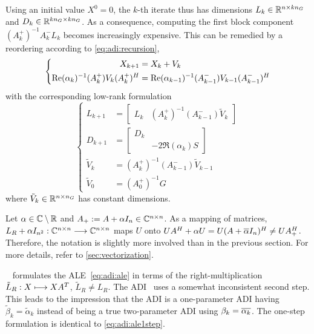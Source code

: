 Using an initial value $X^0=0$,
the $k$-th iterate thus has dimensions $L_k \in\mathbb{R}^{n\times kn_G}$ and $D_k \in\mathbb{R}^{kn_G\times kn_G}$.
As a consequence, computing the first block component $(A_k^+)^{-1} A_k^- L_k$ becomes increasingly expensive.
This can be remedied by a reordering according to \eqref{eq:adi:recursion},
\begin{equation}
\left\{
\begin{aligned}
  X_{k+1} &= X_k + V_k
  \\
  \operatorname{Re}(\alpha_k)^{-1}
  (A_k^+) V_k (A_k^+)^H
  &=
  \operatorname{Re}(\alpha_{k-1})^{-1}
  (A_{k-1}^-) V_{k-1} (A_{k-1}^-)^H
\end{aligned}
\right.
\end{equation}
with the corresponding low-rank formulation
\begin{equation*}
\left\{
\begin{aligned}
  L_{k+1} &= \begin{bmatrix}
    L_k &
    (A_k^+)^{-1} (A_{k-1}^-) \tilde V_k
  \end{bmatrix}
  \\
  D_{k+1} &= \begin{bmatrix}
    D_k \\
    & -2\Re(\alpha_k) S
  \end{bmatrix}
  \\
  \tilde V_k &= (A_k^+)^{-1} (A_{k-1}^-) \tilde V_{k-1}
  \\
  \tilde V_0 &= (A_0^+)^{-1} G
\end{aligned}
\right.
\end{equation*}
where $\tilde V_k \in\mathbb{R}^{n\times n_G}$ has constant dimensions.


\begin{remark}
  Let $\alpha\in\mathbb{C}\setminus\mathbb{R}$ and $A_+ := A+\alpha I_n \in\mathbb{C}^{n\times n}$.
  As a mapping of matrices,
  $L_R + \alpha I_{n^2} : \mathbb{C}^{n\times n} \longrightarrow \mathbb{C}^{n\times n}$ maps $U$ onto
  $
    U A^\HT + \alpha U =
    U(A+\conj{\alpha} I_n)^\HT \neq
    U A_+^\HT
  $.
  Therefore, the notation is slightly more involved than in the previous section.
  For more details, refer to \autoref{sec:vectorization}.
\end{remark}

\begin{remark}
  \citeauthor{Lang2017}~\cite{Lang2017} formulates the \ac{ALE}~\eqref{eq:adi:ale} in terms of the
  right-multiplication $\tilde L_R :X \longmapsto XA^T$, $\tilde L_R \neq L_R$.
  The ADI~\cite[Equation~(2.23)]{Lang2017} uses a somewhat inconsistent second step.
  This leads to the impression that the ADI is a one-parameter ADI having $\tilde\beta_k = \tilde\alpha_k$
  instead of being a true two-parameter ADI using $\beta_k = \conj{\alpha_k}$.
  The one-step formulation \cite[Equation~(2.24)]{Lang2017} is identical to \eqref{eq:adi:ale1step}.
\end{remark}

